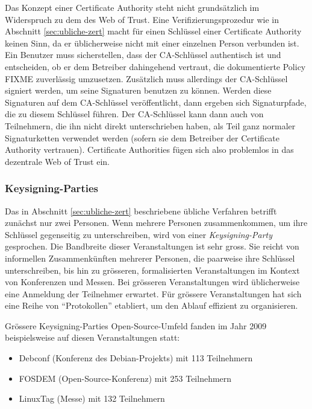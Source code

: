 Das Konzept einer Certificate Authority steht nicht grunds\"atzlich im
Widerspruch zu dem des Web of Trust. Eine Verifizierungsprozedur wie
in Abschnitt \ref{sec:ubliche-zert} macht f\"ur einen Schl\"ussel
einer Certificate Authority keinen Sinn, da er \"ublicherweise nicht
mit einer einzelnen Person verbunden ist. Ein Benutzer muss
sicherstellen, dass der CA-Schl\"ussel authentisch ist und
entscheiden, ob er dem Betreiber dahingehend vertraut, die
dokumentierte Policy FIXME zuverl\"assig umzusetzen. Zus\"atzlich muss
allerdings der CA-Schl\"ussel signiert werden, um seine Signaturen
benutzen zu k\"onnen. Werden diese Signaturen auf dem CA-Schl\"ussel
ver\"offentlicht, dann ergeben sich Signaturpfade, die zu diesem
Schl\"ussel f\"uhren. Der CA-Schl\"ussel kann dann auch von
Teilnehmern, die ihn nicht direkt unterschrieben haben, als Teil ganz
normaler Signaturketten verwendet werden (sofern sie dem Betreiber der
Certificate Authority vertrauen). Certificate Authorities f\"ugen sich
also problemlos in das dezentrale Web of Trust ein.

\subsubsection{Keysigning-Parties}
\label{sec:keysigning-parties}

Das in Abschnitt \ref{sec:ubliche-zert} beschriebene \"ubliche
Verfahren betrifft zun\"achst nur zwei Personen. Wenn mehrere Personen
zusammenkommen, um ihre Schl\"ussel gegenseitig zu unterschreiben,
wird von einer \emph{Keysigning-Party} gesprochen. Die Bandbreite
dieser Veranstaltungen ist sehr gross. Sie reicht von informellen
Zusammenk\"unften mehrerer Personen, die paarweise ihre Schl\"ussel
unterschreiben, bis hin zu gr\"osseren, formalisierten Veranstaltungen
im Kontext von Konferenzen und Messen. Bei gr\"osseren Veranstaltungen
wird \"ublicherweise eine Anmeldung der Teilnehmer erwartet. F\"ur
gr\"ossere Veranstaltungen hat sich eine Reihe von ``Protokollen''
etabliert, um den Ablauf effizient zu organisieren\cite{Brennen2008}.

Gr\"ossere Keysigning-Parties Open-Source-Umfeld fanden im Jahr 2009
beispielsweise auf diesen Veranstaltungen statt:
\begin{itemize}
\item Debconf (Konferenz des Debian-Projekts) mit 113 Teilnehmern
\item FOSDEM (Open-Source-Konferenz) mit 253 Teilnehmern
\item LinuxTag (Messe) mit 132 Teilnehmern
\end{itemize}

